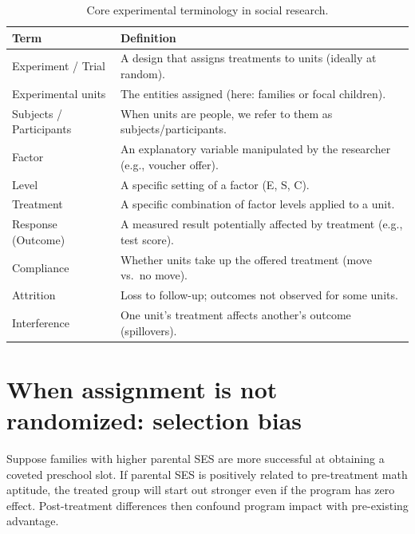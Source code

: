 \documentclass[
  letterpaper,
  DIV=11,
  numbers=noendperiod]{scrreprt}
\begin{document}
\begin{longtable}[]{@{}
  >{\raggedright\arraybackslash}p{}
  >{\raggedright\arraybackslash}p{}@{}}

\caption{\label{tbl-exp-terms}Core experimental terminology in social
research.}

\tabularnewline

\toprule\noalign{}
\begin{minipage}[b]{\linewidth}\raggedright
Term
\end{minipage} & \begin{minipage}[b]{\linewidth}\raggedright
Definition
\end{minipage} \\
\midrule\noalign{}
\endhead
\bottomrule\noalign{}
\endlastfoot
Experiment / Trial & A design that assigns treatments to units (ideally
at random). \\
Experimental units & The entities assigned (here: families or focal
children). \\
Subjects / Participants & When units are people, we refer to them as
subjects/participants. \\
Factor & An explanatory variable manipulated by the researcher (e.g.,
voucher offer). \\
Level & A specific setting of a factor (E, S, C). \\
Treatment & A specific combination of factor levels applied to a
unit. \\
Response (Outcome) & A measured result potentially affected by treatment
(e.g., test score). \\
Compliance & Whether units take up the offered treatment (move vs.~no
move). \\
Attrition & Loss to follow-up; outcomes not observed for some units. \\
Interference & One unit's treatment affects another's outcome
(spillovers). \\

\end{longtable}

\section{When assignment is not randomized: selection
bias}\label{when-assignment-is-not-randomized-selection-bias}

Suppose families with higher parental SES are more successful at
obtaining a coveted preschool slot. If parental SES is positively
related to pre-treatment math aptitude, the treated group will start out
stronger even if the program has zero effect. Post-treatment differences
then confound program impact with pre-existing advantage.
\end{document}
